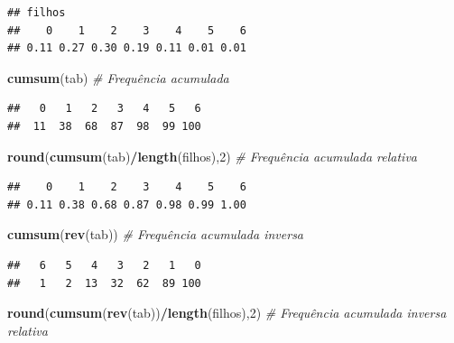 \documentclass[
]{book}
\newenvironment{Shaded}{\begin{snugshade}}{\end{snugshade}}
\newcommand{\CommentTok}[1]{\textcolor[rgb]{0.56,0.35,0.01}{\textit{#1}}}
\newcommand{\DecValTok}[1]{\textcolor[rgb]{0.00,0.00,0.81}{#1}}
\newcommand{\KeywordTok}[1]{\textcolor[rgb]{0.13,0.29,0.53}{\textbf{#1}}}
\newcommand{\NormalTok}[1]{#1}
\newcommand{\OperatorTok}[1]{\textcolor[rgb]{0.81,0.36,0.00}{\textbf{#1}}}
\theoremstyle{definition}
\theoremstyle{definition}
\theoremstyle{definition}
\theoremstyle{remark}
\begin{document}
\begin{verbatim}
## filhos
##    0    1    2    3    4    5    6 
## 0.11 0.27 0.30 0.19 0.11 0.01 0.01
\end{verbatim}

\begin{Shaded}
\begin{Highlighting}[]
\KeywordTok{cumsum}\NormalTok{(tab)                               }\CommentTok{\# Frequência acumulada}
\end{Highlighting}
\end{Shaded}

\begin{verbatim}
##   0   1   2   3   4   5   6 
##  11  38  68  87  98  99 100
\end{verbatim}

\begin{Shaded}
\begin{Highlighting}[]
\KeywordTok{round}\NormalTok{(}\KeywordTok{cumsum}\NormalTok{(tab)}\OperatorTok{/}\KeywordTok{length}\NormalTok{(filhos),}\DecValTok{2}\NormalTok{)       }\CommentTok{\# Frequência acumulada relativa}
\end{Highlighting}
\end{Shaded}

\begin{verbatim}
##    0    1    2    3    4    5    6 
## 0.11 0.38 0.68 0.87 0.98 0.99 1.00
\end{verbatim}

\begin{Shaded}
\begin{Highlighting}[]
\KeywordTok{cumsum}\NormalTok{(}\KeywordTok{rev}\NormalTok{(tab))                          }\CommentTok{\# Frequência acumulada inversa}
\end{Highlighting}
\end{Shaded}

\begin{verbatim}
##   6   5   4   3   2   1   0 
##   1   2  13  32  62  89 100
\end{verbatim}

\begin{Shaded}
\begin{Highlighting}[]
\KeywordTok{round}\NormalTok{(}\KeywordTok{cumsum}\NormalTok{(}\KeywordTok{rev}\NormalTok{(tab))}\OperatorTok{/}\KeywordTok{length}\NormalTok{(filhos),}\DecValTok{2}\NormalTok{)  }\CommentTok{\# Frequência acumulada inversa relativa}
\end{Highlighting}
\end{Shaded}
\end{document}
